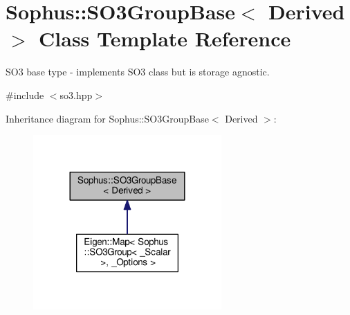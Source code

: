 \hypertarget{class_sophus_1_1_s_o3_group_base}{}\section{Sophus\+:\+:S\+O3\+Group\+Base$<$ Derived $>$ Class Template Reference}
\label{class_sophus_1_1_s_o3_group_base}


S\+O3 base type -\/ implements S\+O3 class but is storage agnostic.  




{\ttfamily \#include $<$so3.\+hpp$>$}



Inheritance diagram for Sophus\+:\+:S\+O3\+Group\+Base$<$ Derived $>$\+:
\nopagebreak
\begin{figure}[H]
\begin{center}
\leavevmode
\includegraphics[width=204pt]{class_sophus_1_1_s_o3_group_base__inherit__graph}
\end{center}
\end{figure}
